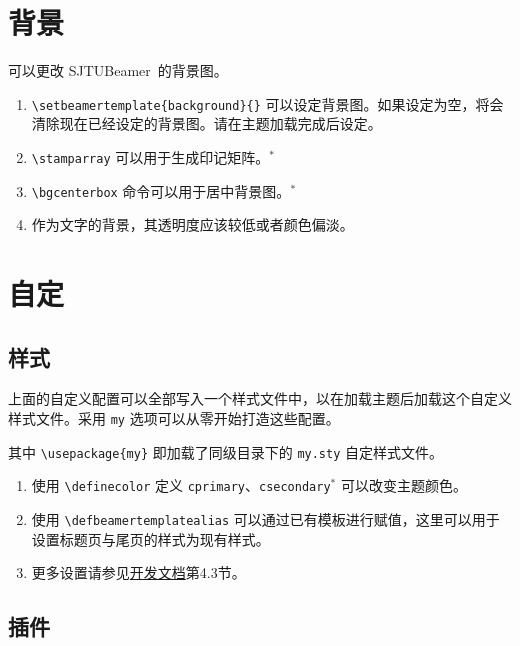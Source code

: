 \documentclass[
    UTF8,
    heading=true,
    12pt,
    a4paper
]{ctexrep}
\newenvironment{commentlist}{\begin{enumerate}\small}{\end{enumerate}}
\def\themename{\textsf{SJTUBeamer}}
\begin{document}
\chapter{背景}

可以更改 \themename\ 的背景图。


\begin{commentlist}
  \item \texttt{\textbackslash{}setbeamertemplate\{background\}\{\}} 可以设定背景图。如果设定为空，将会清除现在已经设定的背景图。请在主题加载完成后设定。
  \item \texttt{\textbackslash{}stamparray} 可以用于生成印记矩阵。$^*$
  \item \texttt{\textbackslash{}bgcenterbox} 命令可以用于居中背景图。$^*$
  \item 作为文字的背景，其透明度应该较低或者颜色偏淡。
\end{commentlist}

\chapter{自定}

\section{样式}

上面的自定义配置可以全部写入一个样式文件中，以在加载主题后加载这个自定义样式文件。采用 \texttt{my} 选项可以从零开始打造这些配置。


其中 \verb"\usepackage{my}" 即加载了同级目录下的 \verb"my.sty" 自定样式文件。


\begin{commentlist}
  \item 使用 \texttt{\textbackslash{}definecolor} 定义 \texttt{cprimary}、\texttt{csecondary}$^*$ 可以改变主题颜色。
  \item 使用 \texttt{\textbackslash{}defbeamertemplatealias} 可以通过已有模板进行赋值，这里可以用于设置标题页与尾页的样式为现有样式。
  \item 更多设置请参见\href{run:sjtubeamerdevguide.pdf}{开发文档}第4.3节。
\end{commentlist}

\section{插件}
\end{document}

